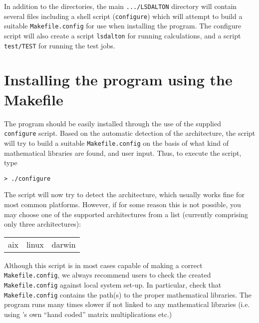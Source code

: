 In addition to the directories, the main \verb|.../LSDALTON| directory will
contain several files including a shell script (\verb|configure|)
which will attempt to build a suitable \verb|Makefile.config| for use when
installing the program. The configure script will also create a
script \verb|lsdalton| for running calculations, and a script
\verb|test/TEST| for running the test jobs.

\section{Installing the program using the
Makefile}\label{sec:Makefile}

The program should be easily installed through the use of the supplied
\verb|configure| script. Based on the
automatic detection of the architecture, the
script will try to build a suitable
\verb|Makefile.config| on the
basis of what kind of mathematical libraries are found, and user
input. Thus, to execute the script, type
\begin{verbatim}
> ./configure 
\end{verbatim}

The script will now try to detect the architecture, which usually works fine
for most common platforms. However, if for some reason this is not possible, you
may choose one of the supported architectures from a list (currently comprising
only three architectures):

\bigskip

\begin{tabular}{lll}
aix \hspace{2cm} & linux \hspace{2cm}    & darwin\\
\end{tabular}

\bigskip

Although this script is in most cases  capable of making a correct
\verb|Makefile.config|, we always recommend users to check the created
\verb|Makefile.config| against local system set-up. 
In particular, check that \verb|Makefile.config| contains the path(s)
to the proper mathematical libraries. The program runs many times slower
if not linked to any mathematical libraries (i.e. using {\lsdalton}'s own 
``hand coded'' matrix multiplications etc.)

